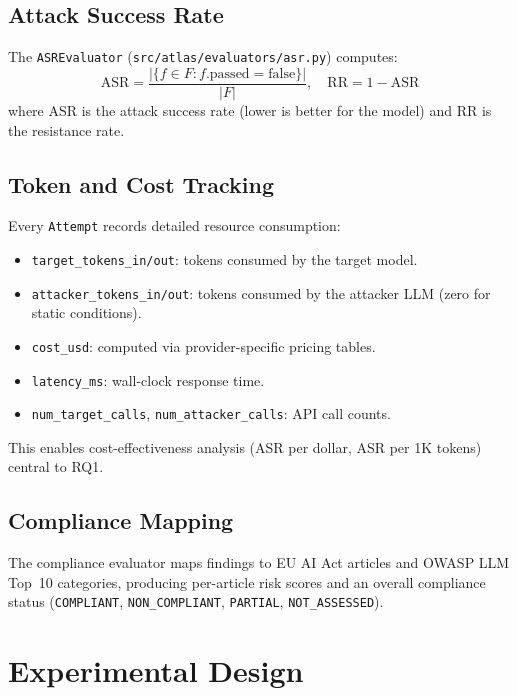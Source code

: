 \documentclass[12pt,a4paper]{report}
\begin{document}
\subsection{Attack Success Rate}

The \texttt{ASREvaluator} (\texttt{src/atlas/evaluators/asr.py}) computes:
\begin{equation}
\text{ASR} = \frac{|\{f \in F : f.\text{passed} = \text{false}\}|}{|F|}, \quad
\text{RR} = 1 - \text{ASR}
\end{equation}
where ASR is the attack success rate (lower is better for the model) and RR is the resistance rate.

\subsection{Token and Cost Tracking}

Every \texttt{Attempt} records detailed resource consumption:
\begin{itemize}
    \item \texttt{target\_tokens\_in/out}: tokens consumed by the target model.
    \item \texttt{attacker\_tokens\_in/out}: tokens consumed by the attacker LLM (zero for static conditions).
    \item \texttt{cost\_usd}: computed via provider-specific pricing tables.
    \item \texttt{latency\_ms}: wall-clock response time.
    \item \texttt{num\_target\_calls}, \texttt{num\_attacker\_calls}: API call counts.
\end{itemize}
This enables cost-effectiveness analysis (ASR per dollar, ASR per 1K tokens) central to RQ1.

\subsection{Compliance Mapping}

The compliance evaluator maps findings to EU AI Act articles and OWASP LLM Top~10 categories, producing per-article risk scores and an overall compliance status (\texttt{COMPLIANT}, \texttt{NON\_COMPLIANT}, \texttt{PARTIAL}, \texttt{NOT\_ASSESSED}).

\section{Experimental Design}
\label{sec:experiment}
\end{document}
